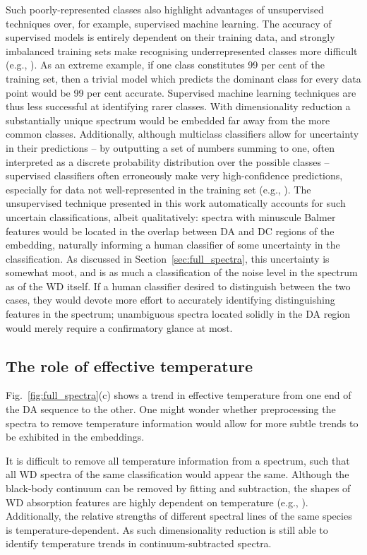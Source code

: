 \documentclass[fleqn,usenatbib]{mnras}
\begin{document}
Such poorly-represented classes also highlight advantages of unsupervised techniques over, for example, supervised machine learning.
The accuracy of supervised models is entirely dependent on their training data, and strongly imbalanced training sets make recognising underrepresented classes more difficult (e.g., \citealt{he09, johnson19, das23}).
As an extreme example, if one class constitutes 99 per cent of the training set, then a trivial model which predicts the dominant class for every data point would be 99 per cent accurate.
Supervised machine learning techniques are thus less successful at identifying rarer classes.
With dimensionality reduction a substantially unique spectrum would be embedded far away from the more common classes.
Additionally, although multiclass classifiers allow for uncertainty in their predictions -- by outputting a set of numbers summing to one, often interpreted as a discrete probability distribution over the possible classes -- supervised classifiers often erroneously make very high-confidence predictions, especially for data not well-represented in the training set (e.g., \citealt{nguyen15, guo17, hein19}).
The unsupervised technique presented in this work automatically accounts for such uncertain classifications, albeit qualitatively: spectra with minuscule Balmer features would be located in the overlap between DA and DC regions of the embedding, naturally informing a human classifier of some uncertainty in the classification.
As discussed in Section~\ref{sec:full_spectra}, this uncertainty is somewhat moot, and is as much a classification of the noise level in the spectrum as of the WD itself.
If a human classifier desired to distinguish between the two cases, they would devote more effort to accurately identifying distinguishing features in the spectrum; unambiguous spectra located solidly in the DA region would merely require a confirmatory glance at most.

\subsection{The role of effective temperature}
\label{sec:discteff}

Fig.~\ref{fig:full_spectra}(c) shows a trend in effective temperature from one end of the DA sequence to the other.
One might wonder whether preprocessing the spectra to remove temperature information would allow for more subtle trends to be exhibited in the embeddings.

It is difficult to remove all temperature information from a spectrum, such that all WD spectra of the same classification would appear the same.
Although the black-body continuum can be removed by fitting and subtraction, the shapes of WD absorption features are highly dependent on temperature (e.g., \citealt{liebert05, tremblay09}).
Additionally, the relative strengths of different spectral lines of the same species is temperature-dependent.
As such dimensionality reduction is still able to identify temperature trends in continuum-subtracted spectra.
\end{document}
